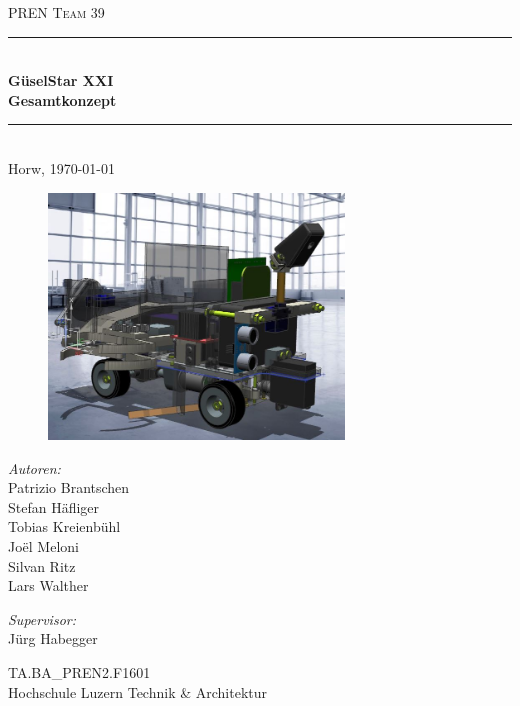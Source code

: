 \begin{titlepage}   

\begin{center}
\textsc{\Large PREN Team 39}\\[0.5cm]

\newcommand{\HRule}{\rule{\linewidth}{0.5mm}}
\HRule \\[0.4cm]
{ \huge \bfseries GüselStar XXI}\\[0.4cm]
{ \LARGE \bfseries Gesamtkonzept}\\[0.4cm]
\HRule \\[1.5cm]

{\large Horw, \today}

\begin{figure}[H]%
\centering
\includegraphics[width=0.7\textwidth]{03_Loesungskonzept/pictures/Tietelbild1.JPG}
\label{fig:activityRoute}
\end{figure}
\begin{minipage}{0.4\textwidth}
\begin{flushleft} \large
\emph{Autoren:}\\
Patrizio Brantschen\\
Stefan Häfliger\\
Tobias Kreienbühl\\
Joël Meloni\\
Silvan Ritz\\
Lars Walther\\
\end{flushleft}
\end{minipage}
\hfill
\begin{minipage}{0.4\textwidth}
\begin{flushright} \large
\emph{Supervisor:} \\
Jürg Habegger
\end{flushright}
\end{minipage}
\large
\vfill
TA.BA\_PREN2.F1601 \\
Hochschule Luzern Technik \& Architektur

\end{center}

\end{titlepage}